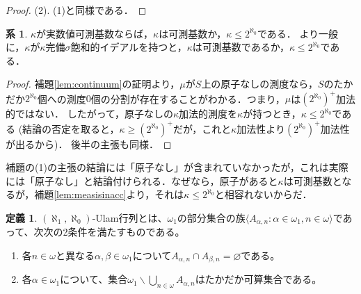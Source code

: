 \documentclass[uplatex]{jsarticle}
\newcommand{\seq}[1]{{\langle#1\rangle}}
\renewcommand\emptyset{\varnothing}
\renewcommand{\setminus}{\smallsetminus}
\theoremstyle{definition}
\newtheorem{defi}[thm]{定義}
\newtheorem{cor}[thm]{系}
\begin{document}
\begin{proof}

		
		
		(2). (1)と同様である．
	\end{proof}
	
	\begin{cor}
		$\kappa$が実数値可測基数ならば，$\kappa$は可測基数か，$\kappa \le 2^{\aleph_0}$である．
		より一般に，$\kappa$が$\kappa$完備$\sigma$飽和的イデアルを持つと，$\kappa$は可測基数であるか，$\kappa \le 2^{\aleph_0}$である．
	\end{cor}
	\begin{proof}
		補題\ref{lem:continuum}の証明より，$\mu$が$S$上の原子なしの測度なら，$S$のたかだか$2^{\aleph_0}$個への測度$0$個の分割が存在することがわかる．つまり，$\mu$は$(2^{\aleph_0})^+$加法的ではない．
		したがって，原子なしの$\kappa$加法的測度を$\kappa$が持つとき，$\kappa \le 2^{\aleph_0}$である (結論の否定を取ると，$\kappa \ge (2^{\aleph_0})^+$だが，これと$\kappa$加法性より$(2^{\aleph_0})^+$加法性が出るから)．
		後半の主張も同様．
	\end{proof}

	補題\label{lem:continuum}の(1)の主張の結論には「原子なし」が含まれていなかったが，これは実際には「原子なし」と結論付けられる．なぜなら，原子があると$\kappa$は可測基数となるが，補題\ref{lem:measisinacc}より，それは$\kappa \le 2^{\aleph_0}$と相容れないからだ．
	
	\begin{defi}
		$(\aleph_1, \aleph_0)$-Ulam行列とは、$\omega_1$の部分集合の族$\seq{ A_{\alpha, n} : \alpha \in \omega_1, n \in \omega }$であって、次次の2条件を満たすものである。
		\begin{enumerate}
			\item 各$n \in \omega$と異なる$\alpha, \beta \in \omega_1$について$A_{\alpha,n} \cap A_{\beta,n} = \emptyset$である。
			\item 各$\alpha \in \omega_1$について、集合$\omega_1 \setminus \bigcup_{n \in \omega} A_{\alpha,n}$はたかだか可算集合である。
		\end{enumerate}
	\end{defi}
	
\end{document}
